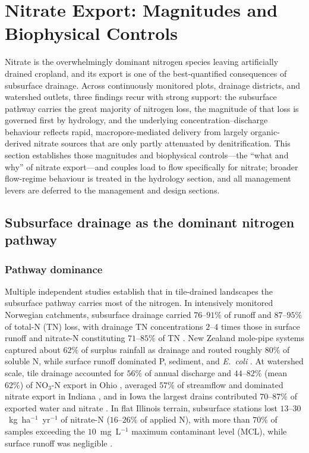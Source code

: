 \documentclass[11pt]{article}
\begin{document}
\section*{Nitrate Export: Magnitudes and Biophysical Controls}

Nitrate is the overwhelmingly dominant nitrogen species leaving artificially
drained cropland, and its export is one of the best-quantified consequences of
subsurface drainage. Across continuously monitored plots, drainage districts,
and watershed outlets, three findings recur with strong support: the
subsurface pathway carries the great majority of nitrogen loss, the magnitude
of that loss is governed first by hydrology, and the underlying
concentration--discharge behaviour reflects rapid, macropore-mediated delivery
from largely organic-derived nitrate sources that are only partly attenuated by
denitrification. This section establishes those magnitudes and biophysical
controls---the ``what and why'' of nitrate export---and couples load to flow
specifically for nitrate; broader flow-regime behaviour is treated in the
hydrology section, and all management levers are deferred to the management and
design sections.

\subsection{Subsurface drainage as the dominant nitrogen pathway}

\subsubsection{Pathway dominance}

Multiple independent studies establish that in tile-drained landscapes the
subsurface pathway carries most of the nitrogen. In intensively monitored
Norwegian catchments, subsurface drainage carried $76$--$91\%$ of runoff and
$87$--$95\%$ of total-N (TN) loss, with drainage TN concentrations $2$--$4$
times those in surface runoff and nitrate-N constituting $71$--$85\%$ of TN
\parencite{Bechmann2014}. New Zealand mole-pipe systems captured about $62\%$
of surplus rainfall as drainage and routed roughly $80\%$ of soluble N, while
surface runoff dominated P, sediment, and \emph{E.\ coli}
\parencite{Monaghan2016}. At watershed scale, tile drainage accounted for
$56\%$ of annual discharge and $44$--$82\%$ (mean $62\%$) of NO$_3$-N export in
Ohio \parencite{Williams2015}, averaged $57\%$ of streamflow and dominated
nitrate export in Indiana \parencite{Grose2022}, and in Iowa the largest drains
contributed $70$--$87\%$ of exported water and nitrate \parencite{Coupe2020}.
In flat Illinois terrain, subsurface stations lost
$13$--$30$~kg~ha$^{-1}$~yr$^{-1}$ of nitrate-N ($16$--$26\%$ of applied N), with
more than $70\%$ of samples exceeding the $10$~mg~L$^{-1}$ maximum contaminant
level (MCL), while surface runoff was negligible \parencite{Dattamudi2020}.
\end{document}
